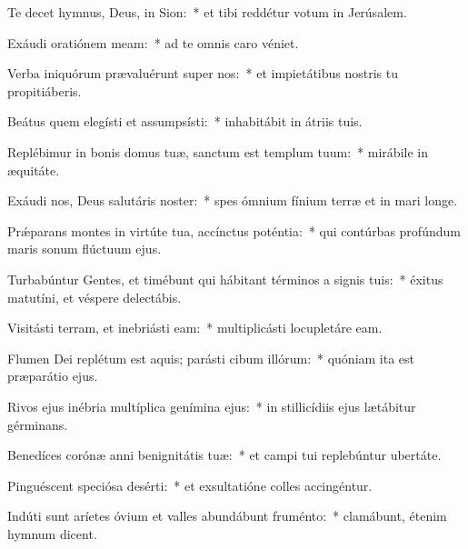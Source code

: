 \item Te decet hymnus, Deus, in Sion:~* et tibi reddétur votum in Jerúsalem.

\item Exáudi oratiónem meam:~* ad te omnis caro véniet.

\item Verba iniquórum prævaluérunt super nos:~* et impietátibus nostris tu propitiáberis.

\item Beátus quem elegísti et assumpsísti:~* inhabitábit in átriis tuis.

\item Replébimur in bonis domus tuæ, sanctum est templum tuum:~* mirábile in æquitáte.

\item Exáudi nos, Deus salutáris noster:~* spes ómnium fínium terræ et in mari longe.

\item Prǽparans montes in virtúte tua, accínctus poténtia:~* qui contúrbas profúndum maris sonum flúctuum ejus.

\item Turbabúntur Gentes, et timébunt qui hábitant términos a signis tuis:~* éxitus matutíni, et véspere delectábis.

\item Visitásti terram, et inebriásti eam:~* multiplicásti locupletáre eam.

\item Flumen Dei replétum est aquis; parásti cibum illórum:~* quóniam ita est præparátio ejus.

\item Rivos ejus inébria multíplica genímina ejus:~* in stillicídiis ejus lætábitur gérminans.

\item Benedíces corónæ anni benignitátis tuæ:~* et campi tui replebúntur ubertáte.

\item Pinguéscent speciósa desérti:~* et exsultatióne colles accingéntur.

\item Indúti sunt aríetes óvium et valles abundábunt fruménto:~* clamábunt, étenim hymnum dicent.
